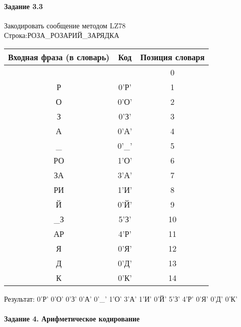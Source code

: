 \documentclass[a4paper, 12pt]{article}
\begin{document}
\paragraph{Задание 3.3}

Закодировать сообщение методом LZ78\\
Строка:РОЗА\_РОЗАРИЙ\_ЗАРЯДКА\\
\begin{table}[h!]
\centering
\begin{tabular}{|c|c|c|} 
\hline
 Входная фраза (в словарь) & Код & Позиция словаря \\ \hline

 &  & 0 \\ \hline
Р & 0'Р' & 1 \\ \hline
О & 0'О' & 2 \\ \hline
З & 0'З' & 3 \\ \hline
А & 0'А' & 4 \\ \hline
\_ & 0'\_' & 5 \\ \hline
РО & 1'О' & 6 \\ \hline
ЗА & 3'А' & 7 \\ \hline
РИ & 1'И' & 8 \\ \hline
Й & 0'Й' & 9 \\ \hline
\_З & 5'З' & 10 \\ \hline
АР & 4'Р' & 11 \\ \hline
Я & 0'Я' & 12 \\ \hline
Д & 0'Д' & 13 \\ \hline
К & 0'К' & 14 \\ \hline
\end{tabular}
\end{table}

Результат: 0'Р' 0'О' 0'З' 0'А' 0'\_' 1'О' 3'А' 1'И' 0'Й' 5'З' 4'Р' 0'Я' 0'Д' 0'К'\\
\pagebreak
\paragraph{Задание 4. Арифметическое кодирование\\}
\end{document}
